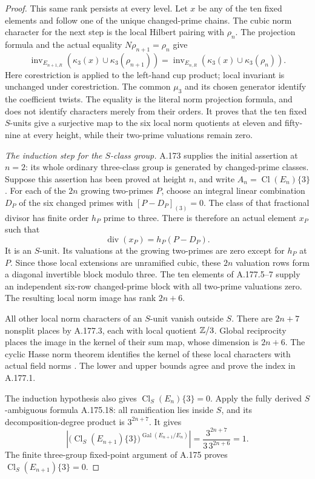 \begin{proof}
This same rank persists at every level.  Let $x$ be any of the
ten fixed elements and follow one of the unique changed-prime
chains.  The cubic norm character for the next step is the local
Hilbert pairing with $\rho_n$.  The projection formula and the
actual equality $N\rho_{n+1}=\rho_n$ give
\[
 \operatorname{inv}_{E_{n+1,R}}
       (\kappa_3(x)\cup\kappa_3(\rho_{n+1}))
 =\operatorname{inv}_{E_{n,R}}
       (\kappa_3(x)\cup\kappa_3(\rho_n)).
\tag{A.177.7}
\]
Here corestriction is applied to the left-hand cup product;
local invariant is unchanged under corestriction.  The common
$\mu_3$ and its chosen generator identify the coefficient twists.
The equality is the literal norm projection formula, and does not
identify characters merely from their orders.
It proves that the ten fixed $S$-units give a surjective map to
the six local norm quotients at eleven and fifty-nine at every
height, while their two-prime valuations remain zero.

\emph{The induction step for the $S$-class group.}
A.173 supplies the initial assertion at $n=2$: its whole ordinary
three-class group is generated by changed-prime classes.
Suppose this assertion has been proved at height $n$, and write
$A_n=\operatorname{Cl}(E_n)\{3\}$.
For each of the $2n$ growing two-primes $P$, choose an integral
linear combination $D_P$ of the six changed primes with
$[P-D_P]_{(3)}=0$.
The class of that fractional divisor has finite order $h_P$ prime
to three.  There is therefore an actual element $x_P$ such that
\[
                    \operatorname{div}(x_P)=h_P(P-D_P).
\tag{A.177.8}
\]
It is an $S$-unit.  Its valuations at the growing two-primes are
zero except for $h_P$ at $P$.
Since those local extensions are unramified cubic, these $2n$
valuation rows form a diagonal invertible block modulo three.
The ten elements of A.177.5--7 supply an independent six-row
changed-prime block with all two-prime valuations zero.
The resulting local norm image has rank $2n+6$.

All other local norm characters of an $S$-unit vanish outside
$S$.  There are $2n+7$ nonsplit places by A.177.3, each with
local quotient $\mathbb Z/3$.  Global reciprocity places the image in
the kernel of their sum map, whose dimension is $2n+6$.
The cyclic Hasse norm theorem identifies the kernel of these
local characters with actual field norms
\cite[Chapter VIII, Theorem 3.1, printed p.~234]{MilneCFT}.
The lower and upper bounds agree and prove the index in A.177.1.

The induction hypothesis also gives
$\operatorname{Cl}_S(E_n)\{3\}=0$.
Apply the fully derived $S$-ambiguous formula A.175.18: all
ramification lies inside $S$, and its decomposition-degree product
is $3^{2n+7}$.  It gives
\[
 \left|\bigl(\operatorname{Cl}_S(E_{n+1})\{3\}\bigr)
                    ^{\operatorname{Gal}(E_{n+1}/E_n)}\right|
               =\frac{3^{2n+7}}{3\,3^{2n+6}}=1.
\tag{A.177.9}
\]
The finite three-group fixed-point argument of A.175 proves
$\operatorname{Cl}_S(E_{n+1})\{3\}=0$.


\end{proof}
